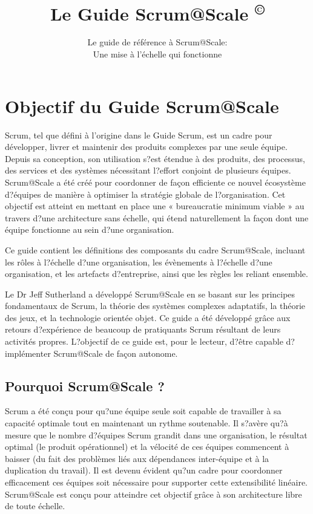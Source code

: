 \documentclass[12pt,a4paper,parskip=full]{scrartcl}
\title{\Huge{\color{red}\textbf{Le Guide Scrum@Scale
\textsuperscript{\copyright}}}}
\subtitle{\color{gray}Le guide de référence à Scrum@Scale:\\ Une mise à l'échelle qui fonctionne}
\date{}
\begin{document}

\section{Objectif du Guide Scrum@Scale}
Scrum, tel que défini à l'origine dans le Guide Scrum, est un cadre pour développer, livrer
et maintenir des produits complexes par une seule équipe. Depuis sa conception, son
utilisation s?est étendue à des produits, des processus, des services et des systèmes
nécessitant l?effort conjoint de plusieurs équipes. Scrum@Scale a été créé pour
coordonner de façon efficiente ce nouvel écosystème d?équipes de manière à optimiser la
stratégie globale de l?organisation. Cet objectif est atteint en mettant en place une
« bureaucratie minimum viable » au travers d?une architecture sans échelle, qui étend
naturellement la façon dont une équipe fonctionne au sein d?une organisation.

Ce guide contient les définitions des composants du cadre Scrum@Scale, incluant les
rôles à l?échelle d?une organisation, les évènements à l?échelle d?une organisation, et les
artefacts d?entreprise, ainsi que les règles les reliant ensemble.

Le Dr Jeff Sutherland a développé Scrum@Scale en se basant sur les principes
fondamentaux de Scrum, la théorie des systèmes complexes adaptatifs, la théorie des
jeux, et la technologie orientée objet. Ce guide a été développé grâce aux retours
d?expérience de beaucoup de pratiquants Scrum résultant de leurs activités propres.
L?objectif de ce guide est, pour le lecteur, d?être capable d?implémenter Scrum@Scale de
façon autonome.

\subsection{Pourquoi Scrum@Scale ?}
Scrum a été conçu pour qu?une équipe seule soit capable de travailler à sa capacité
optimale tout en maintenant un rythme soutenable. Il s?avère qu?à mesure que le nombre
d?équipes Scrum grandit dans une organisation, le résultat optimal (le produit opérationnel)
et la vélocité de ces équipes commencent à baisser (du fait des problèmes liés aux
dépendances inter-équipe et à la duplication du travail). Il est devenu évident qu?un cadre
pour coordonner efficacement ces équipes soit nécessaire pour supporter cette
extensibilité linéaire. Scrum@Scale est conçu pour atteindre cet objectif grâce à son
architecture libre de toute échelle.
\end{document}
